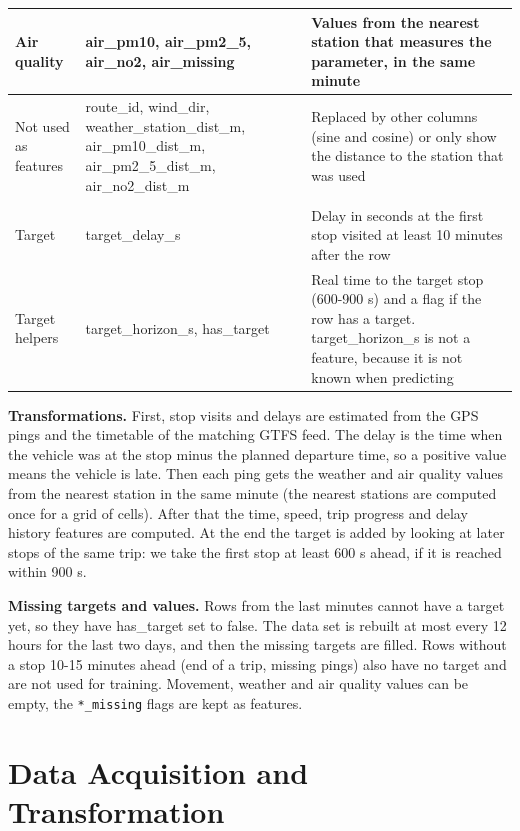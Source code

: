 \documentclass[11pt]{article}
\begin{document}
\begin{table}[H]
\begin{tabular}{|>{\raggedright\arraybackslash}p{2.4cm}|>{\raggedright\arraybackslash}p{4.4cm}|>{\raggedright\arraybackslash}p{6.6cm}|}
\hline
Air quality & air\_pm10, air\_pm2\_5, air\_no2, air\_missing & Values from the nearest station that measures the parameter, in the same minute \\
\hline
Not used as features & route\_id, wind\_dir, weather\_station\_dist\_m, air\_pm10\_dist\_m, air\_pm2\_5\_dist\_m, air\_no2\_dist\_m & Replaced by other columns (sine and cosine) or only show the distance to the station that was used \\
\hline
\multicolumn{3}{|l|}{\textit{Dependent variable}} \\
\hline
Target & target\_delay\_s & Delay in seconds at the first stop visited at least 10 minutes after the row \\
\hline
Target helpers & target\_horizon\_s, has\_target & Real time to the target stop (600-900 s) and a flag if the row has a target. target\_horizon\_s is not a feature, because it is not known when predicting \\
\hline
\end{tabular}
\end{table}

\noindent\textbf{Transformations.}
First, stop visits and delays are estimated from the GPS pings and the timetable of the matching GTFS feed. The delay is the time
when the vehicle was at the stop minus the planned departure time, so a positive value means the vehicle is late.
Then each ping gets the weather and air quality values from the nearest station in the same minute (the nearest stations are
computed once for a grid of cells). After that the time, speed, trip progress and delay history features are computed.
At the end the target is added by looking at later stops of the same trip: we take the first stop at least 600 s ahead,
if it is reached within 900 s.

\noindent\textbf{Missing targets and values.}
Rows from the last minutes cannot have a target yet, so they have has\_target set to false. The data set is rebuilt at most every
12 hours for the last two days, and then the missing targets are filled. Rows without a stop 10-15 minutes ahead (end of a trip,
missing pings) also have no target and are not used for training. Movement, weather and air quality values can be empty, the
\texttt{*\_missing} flags are kept as features.

\section{Data Acquisition and Transformation}
\label{sec:data-acquisition-transformation}
\end{document}
